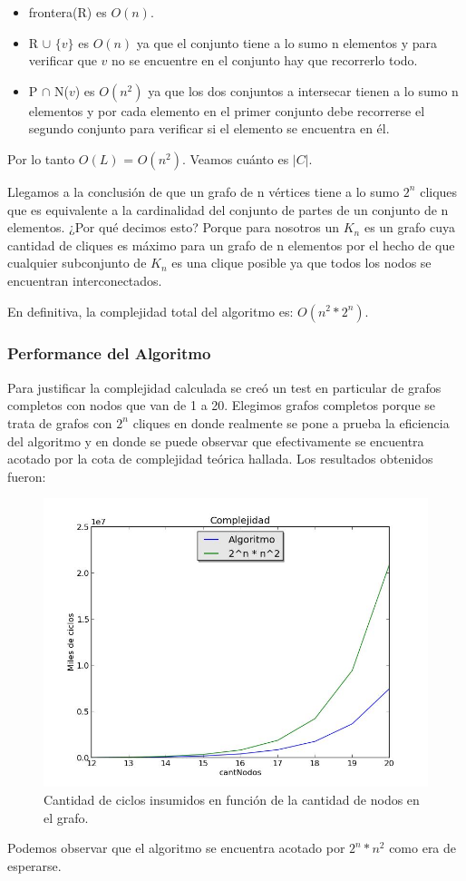 \begin{itemize}
 \item frontera(R) es $O(n)$.
 \item R $\cup$ $\{v\}$ es $O(n)$ ya que el conjunto tiene a lo sumo n elementos y para verificar que $v$ no se encuentre en el conjunto hay que recorrerlo todo.
 \item P $\cap$ N($v$) es $O(n^2)$ ya que los dos conjuntos a intersecar tienen a lo sumo n elementos y por cada elemento en el primer conjunto debe recorrerse el segundo conjunto para verificar si el elemento se encuentra en él.
\end{itemize}

Por lo tanto $O(L)$ = $O(n^2)$. Veamos cuánto es $|C|$.


Llegamos a la conclusión de que un grafo de n vértices tiene a lo sumo $2^n$ cliques que es equivalente a la cardinalidad del conjunto de partes de un conjunto de n elementos. ¿Por qué decimos esto? Porque para nosotros un $K_n$ es un grafo cuya cantidad de cliques es máximo para un grafo de n elementos por el hecho de que cualquier subconjunto de $K_n$ es una clique posible ya que todos los nodos se encuentran interconectados.

En definitiva, la complejidad total del algoritmo es: $O(n^2*2^n)$.

\subsubsection{Performance del Algoritmo}

Para justificar la complejidad calculada se creó un test en particular de grafos completos con nodos que van de 1 a 20. Elegimos grafos completos porque se trata de grafos con $2^n$ cliques en donde realmente se pone a prueba la eficiencia del algoritmo y en donde se puede observar que efectivamente se encuentra acotado por la cota de complejidad teórica hallada. Los resultados obtenidos fueron:

\begin{figure}[H]
\centering\includegraphics[width=11 cm]{exacto/imgs/complejidad.jpg}
\caption{Cantidad de ciclos insumidos en función de la cantidad de nodos en el grafo.}
\end{figure}

Podemos observar que el algoritmo se encuentra acotado por $2^n*n^2$ como era de esperarse.

